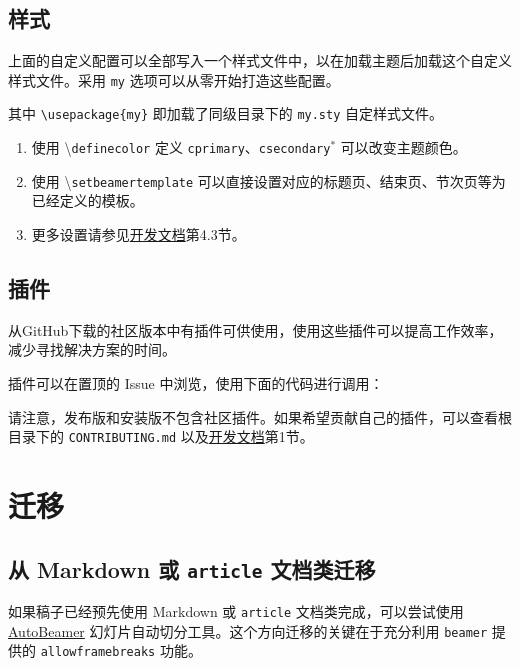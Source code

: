 \documentclass[
    UTF8,
    heading=true,
    12pt,
    a4paper
]{ctexrep}
\newenvironment{commentlist}{\begin{enumerate}\small}{\end{enumerate}}
\newcommand{\cmd}[1]{\textbackslash{}\texttt{#1}}
\begin{document}
\section{样式}

上面的自定义配置可以全部写入一个样式文件中，以在加载主题后加载这个自定义样式文件。采用 \texttt{my} 选项可以从零开始打造这些配置。


其中 \verb"\usepackage{my}" 即加载了同级目录下的 \verb"my.sty" 自定样式文件。


\begin{commentlist}
  \item 使用 \cmd{definecolor} 定义 \texttt{cprimary}、\texttt{csecondary}$^*$ 可以改变主题颜色。
  \item 使用 \cmd{setbeamertemplate} 可以直接设置对应的标题页、结束页、节次页等为已经定义的模板。
  \item 更多设置请参见\href{run:sjtubeamerdevguide.pdf}{开发文档}第4.3节。
\end{commentlist}

\section{插件}

从GitHub下载的社区版本中有插件可供使用，使用这些插件可以提高工作效率，减少寻找解决方案的时间。

插件可以在置顶的 Issue 中浏览，使用下面的代码进行调用：

请注意，发布版和安装版不包含社区插件。如果希望贡献自己的插件，可以查看根目录下的 \verb"CONTRIBUTING.md" 以及\href{run:sjtubeamerdevguide.pdf}{开发文档}第1节。


\chapter{迁移}

\section{从 Markdown 或 \texttt{article} 文档类迁移}

如果稿子已经预先使用 Markdown 或 \texttt{article} 文档类完成，可以尝试使用 \href{https://logcreative.github.io/AutoBeamer/}{AutoBeamer} 幻灯片自动切分工具。这个方向迁移的关键在于充分利用 \texttt{beamer} 提供的 \texttt{allowframebreaks} 功能。
\end{document}
